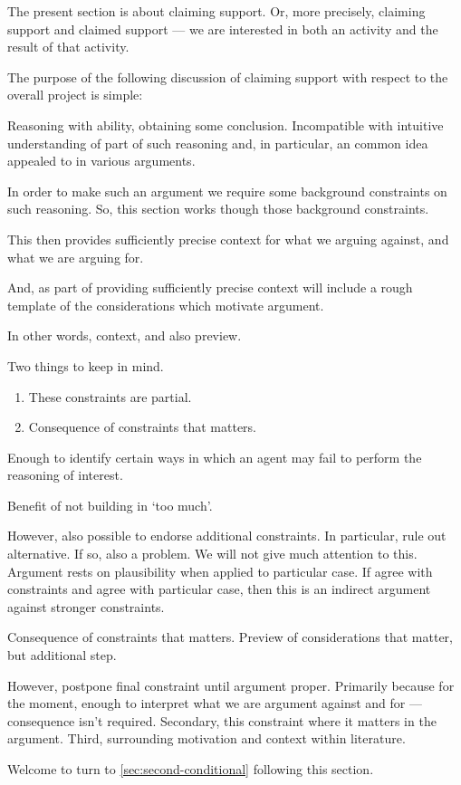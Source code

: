 \begin{note}
  The present {\color{red} section} is about claiming support.
  Or, more precisely, claiming support and claimed support --- we are interested in both an activity and the result of that activity.

  The purpose of the following discussion of claiming support with respect to the {\color{red} overall project} is simple:

  Reasoning with ability, obtaining some conclusion.
  Incompatible with intuitive understanding of part of such reasoning and, in particular, an common idea appealed to in various arguments.

  In order to make such an argument we require some background constraints on such reasoning.
  So, this {\color{red} section} works though those background constraints.

  This then provides sufficiently precise context for what we arguing against, and what we are arguing for.

  And, as part of providing sufficiently precise context will include a rough template of the considerations which motivate argument.

  In other words, context, and also preview.
\end{note}

\begin{note}
  Two things to keep in mind.

  \begin{enumerate}
  \item These constraints are partial.
  \item Consequence of constraints that matters.
  \end{enumerate}

  Enough to identify certain ways in which an agent may fail to perform the reasoning of interest.

  Benefit of not building in `too much'.

  However, also possible to endorse additional constraints.
  In particular, rule out alternative.
  If so, also a problem.
  We will not give much attention to this.
  Argument rests on plausibility when applied to particular case.
  If agree with constraints and agree with particular case, then this is an indirect argument against stronger constraints.


  Consequence of constraints that matters.
  Preview of considerations that matter, but additional step.

  However, postpone final constraint until argument proper.
  Primarily because for the moment, enough to interpret what we are argument against and for --- consequence isn't required.
  Secondary, this constraint where it matters in the argument.
  Third, surrounding motivation and context within literature.

  Welcome to turn to \autoref{sec:second-conditional} following this section.
\end{note}

